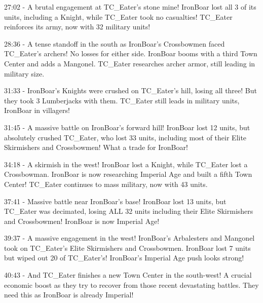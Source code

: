 27:02 - A brutal engagement at TC\_Eater's stone mine! IronBoar lost all 3 of its units, including a Knight, while TC\_Eater took no casualties! TC\_Eater reinforces its army, now with 32 military units! \par \vspace{1em}

28:36 - A tense standoff in the south as IronBoar's Crossbowmen faced TC\_Eater's archers! No losses for either side. IronBoar booms with a third Town Center and adds a Mangonel. TC\_Eater researches archer armor, still leading in military size. \par \vspace{1em}

31:33 - IronBoar's Knights were crushed on TC\_Eater's hill, losing all three! But they took 3 Lumberjacks with them. TC\_Eater still leads in military units, IronBoar in villagers! \par \vspace{1em}

31:45 - A massive battle on IronBoar's forward hill! IronBoar lost 12 units, but absolutely crushed TC\_Eater, who lost 33 units, including most of their Elite Skirmishers and Crossbowmen! What a trade for IronBoar! \par \vspace{1em}

34:18 - A skirmish in the west! IronBoar lost a Knight, while TC\_Eater lost a Crossbowman. IronBoar is now researching Imperial Age and built a fifth Town Center! TC\_Eater continues to mass military, now with 43 units. \par \vspace{1em}

37:41 - Massive battle near IronBoar's base! IronBoar lost 13 units, but TC\_Eater was decimated, losing ALL 32 units including their Elite Skirmishers and Crossbowmen! IronBoar is now Imperial Age! \par \vspace{1em}

39:37 - A massive engagement in the west! IronBoar's Arbalesters and Mangonel took on TC\_Eater's Elite Skirmishers and Crossbowmen. IronBoar lost 7 units but wiped out 20 of TC\_Eater's! IronBoar's Imperial Age push looks strong! \par \vspace{1em}

40:43 - And TC\_Eater finishes a new Town Center in the south-west! A crucial economic boost as they try to recover from those recent devastating battles. They need this as IronBoar is already Imperial! \par \vspace{1em}

